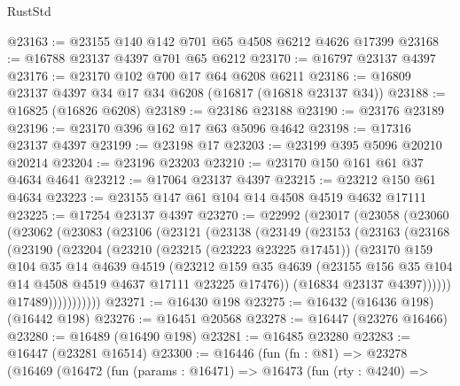 \begin{lexlean}{RustStd}
\begin{coremodule}
@23163 := @23155 @140 @142 @701 @65 @4508 @6212 @4626 @17399
@23168 := @16788 @23137 @4397 @701 @65 @6212
@23170 := @16797 @23137 @4397
@23176 := @23170 @102 @700 @17 @64 @6208 @6211
@23186 := @16809 @23137 @4397 @34 @17 @34 @6208 (@16817 (@16818 @23137 @34))
@23188 := @16825 (@16826 @6208)
@23189 := @23186 @23188
@23190 := @23176 @23189
@23196 := @23170 @396 @162 @17 @63 @5096 @4642
@23198 := @17316 @23137 @4397
@23199 := @23198 @17
@23203 := @23199 @395 @5096 @20210 @20214
@23204 := @23196 @23203
@23210 := @23170 @150 @161 @61 @37 @4634 @4641
@23212 := @17064 @23137 @4397
@23215 := @23212 @150 @61 @4634
@23223 := @23155 @147 @61 @104 @14 @4508 @4519 @4632 @17111
@23225 := @17254 @23137 @4397
@23270 := @22992
    (@23017
      (@23058
        (@23060
          (@23062
            (@23083
              (@23106
                (@23121
                  (@23138
                    (@23149
                      (@23153
                        (@23163
                          (@23168
                            (@23190
                              (@23204
                                (@23210
                                  (@23215 (@23223 @23225 @17451))
                                  (@23170
                                    @159
                                    @104
                                    @35
                                    @14
                                    @4639
                                    @4519
                                    (@23212
                                      @159
                                      @35
                                      @4639
                                      (@23155
                                        @156
                                        @35
                                        @104
                                        @14
                                        @4508
                                        @4519
                                        @4637
                                        @17111
                                        @23225
                                        @17476))
                                    (@16834 @23137 @4397))))))
                          @17489)))))))))))
@23271 := @16430 @198
@23275 := @16432 (@16436 @198) (@16442 @198)
@23276 := @16451 @20568
@23278 := @16447 (@23276 @16466)
@23280 := @16489 (@16490 @198)
@23281 := @16485 @23280
@23283 := @16447 (@23281 @16514)
@23300 := @16446
    (fun (fn : @81) =>
    @23278
      (@16469
        (@16472
          (fun (params : @16471) =>
          @16473
            (fun (rty : @4240) =>

\end{coremodule}
\end{lexlean}
